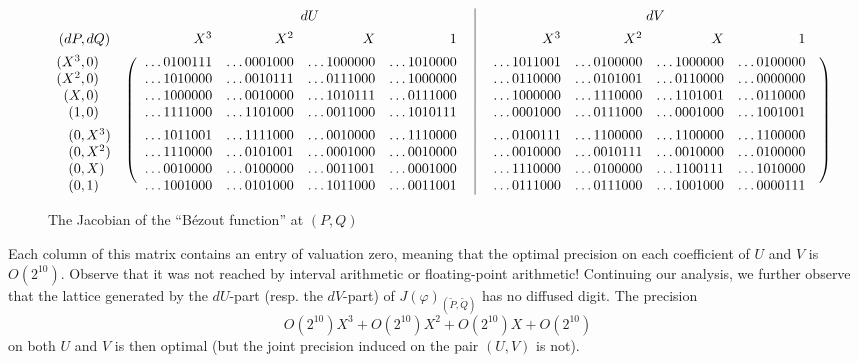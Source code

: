 \documentclass[11pt]{article}
\numberwithin{equation}{section}
\numberwithin{figure}{section}
\theoremstyle{definition}
\begin{document}
\begin{figure}
\hfill{\tiny
$\begin{array}{r@{\hspace{0.3ex}}lc@{\hspace{1ex}}rrrr@{\hspace{3ex}}|@{\hspace{3ex}}rrrr@{\hspace{2ex}}c}
&&& \multicolumn{4}{c|@{\hspace{3ex}}}{dU} & \multicolumn{4}{c}{dV} \\
\rule[3ex]{0pt}{\baselineskip}
(dP,&dQ) && X^3 & X^2 & X & 1 & X^3 & X^2 & X & 1 \\
\rule[3ex]{0pt}{\baselineskip}
(X^3,&0) &
\raisebox{0.2ex}{\multirow{8}{*}{$\left(\parbox[c][22ex]{0cm}{}\right.$}} &
           \ldots0100111 & \ldots0001000 & \ldots1000000 & \ldots1010000 & \ldots1011001 & \ldots0100000 & \ldots1000000 & \ldots0100000 &
\raisebox{0.2ex}{\multirow{8}{*}{$\left.\parbox[c][22ex]{0cm}{}\right)$}} \\
(X^2,&0) &&\ldots1010000 & \ldots0010111 & \ldots0111000 & \ldots1000000 & \ldots0110000 & \ldots0101001 & \ldots0110000 & \ldots0000000 \\
(X,&0)   &&\ldots1000000 & \ldots0010000 & \ldots1010111 & \ldots0111000 & \ldots1000000 & \ldots1110000 & \ldots1101001 & \ldots0110000 \\
(1,&0)   &&\ldots1111000 & \ldots1101000 & \ldots0011000 & \ldots1010111 & \ldots0001000 & \ldots0111000 & \ldots0001000 & \ldots1001001 \\
\rule[3ex]{0pt}{\baselineskip}
(0,&X^3) &&\ldots1011001 & \ldots1111000 & \ldots0010000 & \ldots1110000 & \ldots0100111 & \ldots1100000 & \ldots1100000 & \ldots1100000 \\
(0,&X^2) &&\ldots1110000 & \ldots0101001 & \ldots0001000 & \ldots0010000 & \ldots0010000 & \ldots0010111 & \ldots0010000 & \ldots0100000 \\
(0,&X)   &&\ldots0010000 & \ldots0100000 & \ldots0011001 & \ldots0001000 & \ldots1110000 & \ldots0100000 & \ldots1100111 & \ldots1010000 \\
(0,&1)   &&\ldots1001000 & \ldots0101000 & \ldots1011000 & \ldots0011001 & \ldots0111000 & \ldots0111000 & \ldots1001000 & \ldots0000111 
\end{array}$}
\hfill\null

\caption{The Jacobian of the ``Bézout function'' at $(P,Q)$}
\label{fig:jacBezout}
\end{figure}
%
Each column of this matrix contains an entry of valuation zero, meaning 
that the optimal precision on each coefficient of $U$ and $V$ is 
$O(2^{10})$. Observe that it was not reached by interval arithmetic or 
floating-point arithmetic!
Continuing our analysis, we further observe that the lattice generated 
by the $dU$-part (resp. the $dV$-part) of $J(\varphi)_{(\tilde P, \tilde 
Q)}$ has no diffused digit. The precision
$$O(2^{10}) X^3 + O(2^{10}) X^2 + O(2^{10}) X + O(2^{10})$$
on both $U$ and $V$ is then optimal (but the joint precision induced 
on the pair $(U,V)$ is not).
\end{document}
